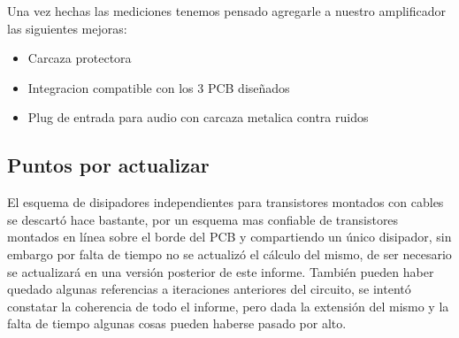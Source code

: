 Una vez hechas las mediciones tenemos pensado agregarle a nuestro amplificador las siguientes mejoras:
\begin{itemize}
\item{Carcaza protectora}
\item{Integracion compatible con los 3 PCB diseñados}
\item{Plug de entrada para audio con carcaza metalica contra ruidos}
\end{itemize}


\subsection{Puntos por actualizar}

El esquema de disipadores independientes para transistores montados con cables se descartó hace bastante, por un esquema mas confiable de transistores montados en línea sobre el borde del PCB y compartiendo un único disipador, sin embargo por falta de tiempo no se actualizó el cálculo del mismo, de ser necesario se actualizará en una versión posterior de este informe. También pueden haber quedado algunas referencias a iteraciones anteriores del circuito, se intentó constatar la coherencia de todo el informe, pero dada la extensión del mismo y la falta de tiempo algunas cosas pueden haberse pasado por alto.


